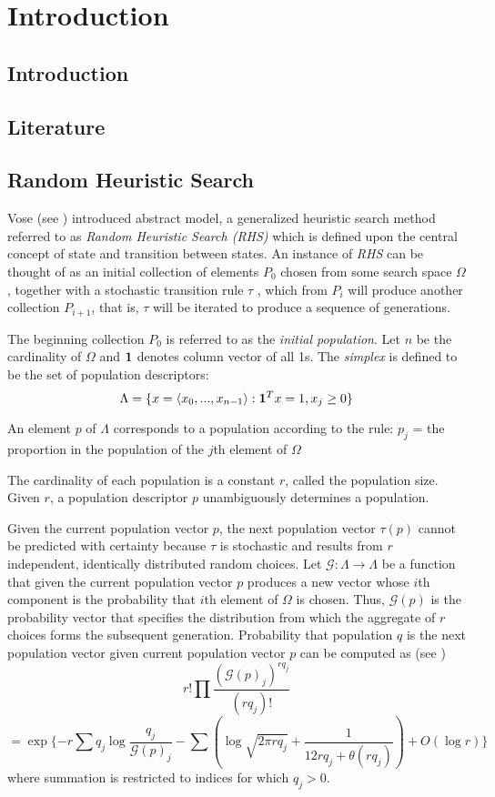 \chapter{Introduction} \label{ch:introduction}

\section{Introduction}
\section{Literature}
\section{Random Heuristic Search}
Vose (see \cite{Vose1999}) introduced abstract model, a generalized heuristic search method referred to as {\em Random Heuristic Search (RHS)} which is defined upon the central concept of state and transition between states. An instance of {\em RHS} can be thought of as an initial collection of elements $P_0$ chosen from some search space $\Omega$ , together with a stochastic transition rule $\tau$ , which from $P_i$ will produce another collection $P_{i+1}$, that is, $\tau$ will be iterated to produce a sequence of generations.

The beginning collection $P_0$ is referred to as the {\em initial population}. Let $n$ be the cardinality of $\Omega$ and ${\bf1}$ denotes column vector of all 1s. The {\em simplex} is defined to be the set of population descriptors:
\[
\Lambda = \{x = \langle x_0,...,x_{n-1} \rangle: {\bf1}^T x=1, x_j \geq 0 \}
\]

An element $p$ of $\Lambda$ corresponds to a population according to the rule:
$p_j$ = the proportion in the population of the $j$th element of $\Omega$

The cardinality of each population is a constant $r$, called the population size. Given $r$, a population descriptor $p$ unambiguously determines a population.

Given the current population vector $p$, the next population vector $\tau(p)$ cannot be predicted with certainty because $\tau$ is stochastic 
and results from $r$ independent, identically distributed random choices. Let $\mathcal{G}:\Lambda \rightarrow \Lambda$ be a function that given the current population vector $p$ produces a new vector whose $i$th component is the probability that $i$th element of $\Omega$ is chosen. Thus, $\mathcal{G}(p)$ is the probability vector that specifies the distribution from which the aggregate of $r$ choices forms the subsequent generation.
Probability that population $q$ is the next population vector given current population vector $p$ can be computed as (see \cite{Vose1999}) 
\[
r! \prod \frac{(\mathcal{G}(p)_j)^{rq_j}}{(rq_j)!}
\]
\[
 = \exp\{-r \sum q_j \log \frac{q_j}{\mathcal{G}(p)_j} - \sum (\log \sqrt{2 \pi rq_j} + \frac{1}{12rq_j + \theta (rq_j)}) + O(\log r)\}
\]
where summation is restricted to indices for which $q_j > 0$.

